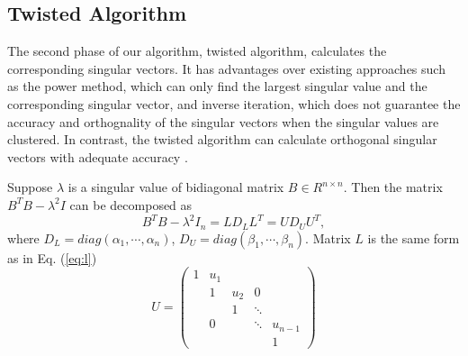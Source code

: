 \subsection{Twisted Algorithm}

The second phase of our algorithm, twisted algorithm, calculates the corresponding singular vectors.
It has advantages over existing approaches such as the power method\cite{08power}, which can only find the largest singular value and the corresponding singular vector, and inverse iteration\cite{11iterative}, which does not guarantee the accuracy and orthognality of the singular vectors when the singular values are clustered. In contrast, the twisted algorithm can calculate  orthogonal singular vectors with adequate accuracy \cite{09NLAAtwisted}. 

Suppose $\lambda$ is a singular value of bidiagonal matrix $B \in R^{n \times n}$.
Then the matrix $B^T B - \lambda^2 I$ can be decomposed as
\begin{equation}
B^T B - \lambda^2 I_n = L D_L L^T = U D_U U^T ,
\end{equation}
where $D_L=diag(\alpha_1, \cdots, \alpha_n)$, $D_U = diag(\beta_1, \cdots, \beta_n)$. Matrix $L$ is the same form as in Eq. (\ref{eq:l})
\begin{equation}
 U =  \left( \begin{array}{ccccc}
  1 & u_{1}&       &       &  \\
    & 1    & u_{2} & 0     &  \\
    &      & 1     & \ddots&  \\
    & 0    &       & \ddots& u_{n-1} \\
    &      &       &       & 1
 \end{array} \right)
\end{equation}


